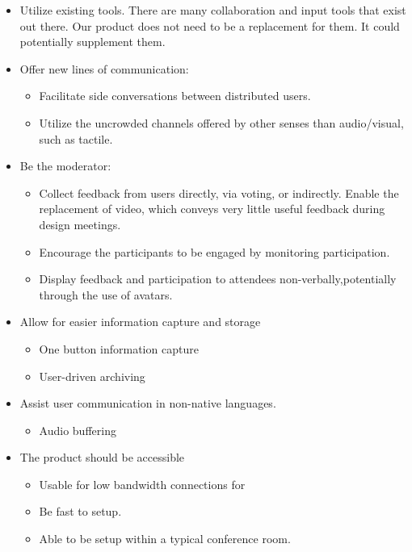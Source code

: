 \begin{itemize}\tightlist
\item Utilize existing tools. There are many collaboration and input  tools that exist out there. Our product does not need to be a replacement for them. It could potentially supplement them.
\item Offer new lines of communication:
	\begin{itemize}\tightlist
 		\item Facilitate side conversations between distributed users.
 		\item Utilize the uncrowded channels offered by other senses than audio/visual, such as tactile.
\end{itemize}
\newpage
\item Be the moderator: 
\begin{itemize}\tightlist
 		\item Collect feedback from users directly, via voting, or indirectly. Enable the replacement of video, which conveys very little useful feedback during design meetings.
		\item Encourage the participants to be engaged by monitoring participation.
		\item Display feedback and participation to attendees non-verbally,potentially through the use of avatars.	
\end{itemize}
\item Allow for easier information capture and storage
\begin{itemize}\tightlist
 		\item One button information capture
		\item User-driven archiving
\end{itemize}
\item Assist user communication in non-native languages.
	\begin{itemize}\tightlist
 		\item Audio buffering
 \end{itemize}
\item The product should be accessible
\begin{itemize}\tightlist
\item Usable for low bandwidth connections for 
\item Be fast to setup.
\item Able to be setup within a typical conference room.
\end{itemize}
\end {itemize}

